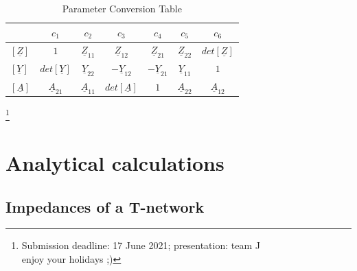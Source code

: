 \documentclass[a4paper]{article}
\renewcommand*{\arraystretch}{1.3}
\newcommand\blfootnote[1]{%
	\begingroup
	\renewcommand\thefootnote{}\footnote{#1}%
	\addtocounter{footnote}{-1}%
	\endgroup
}
\begin{document}
\begin{table}[h]
	\centering
	\renewcommand{\arraystretch}{1.3}
		\begin{tabular}{l||c|c|c|c|c|c}
				& $c_1$& $c_2$& $c_3$& $c_4$& $c_5$& $c_6$ \\ \hline \hline
		$\left[\underline{Z}\right]$ &$ 1 $& $\underline{Z}_{11}$ &$\underline{Z}_{12}$&$\underline{Z}_{21}$&$\underline{Z}_{22}$&$det\left[\underline{Z}\right]$ \\ \hline
	$	\left[\underline{Y}\right]$ &$det\left[\underline{Y}\right]$&$\underline{Y}_{22}$&$-\underline{Y}_{12}$&$-\underline{Y}_{21}$&$\underline{Y}_{11}$&$1$  \\ \hline
	$\left[\underline{A}\right]$ &$\underline{A}_{21} $& $\underline{A}_{11}$ &$det\left[\underline{A}\right]$&$1$&$\underline{A}_{22}$&$\underline{A}_{12}$
		\end{tabular}
	\caption{Parameter Conversion Table}
\end{table}
\blfootnote{Submission deadline: 17 June 2021;  \qquad presentation: team J \\
	 \qquad enjoy your holidays ;)}

\clearpage
\section{Analytical calculations}
\subsection{Impedances of a T-network}
\end{document}
